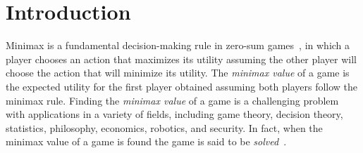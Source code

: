 \documentclass[runningheads]{llncs}
\begin{document}
\begin{abstract}

\end{abstract}






\section{Introduction}


Minimax is a fundamental decision-making rule in zero-sum games~\citep{wald1945statistical}, 
in which a player chooses an action that maximizes its utility assuming the other player will 
choose the action that will minimize its utility. The \emph{minimax value} of a game is the expected utility for the first player obtained assuming both players follow the minimax rule. 
Finding the \emph{minimax value} of a game is a challenging problem with applications in a variety of fields, including game theory, decision theory,  statistics, philosophy, economics, robotics, and security. 
In fact, when the minimax value of a game is found the game is said to be \emph{solved}~\citep{schaeffer2007checkers,irving2000solving,saffidine2011solving}. 
\end{document}

